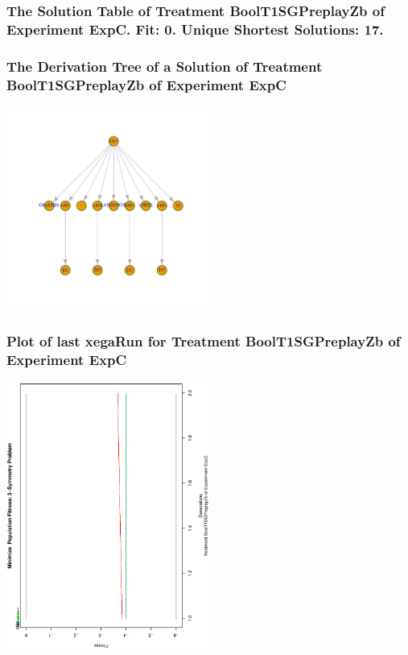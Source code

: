 \documentclass[18pt,c]{beamer}
\begin{document}
 \begin{frame}
 \fontsize{8pt}{9pt}\selectfont
 \frametitle{ The Solution Table of Treatment BoolT1SGPreplayZb of Experiment ExpC. Fit: 0. Unique Shortest Solutions: 17. }

 \label{ExpCSolutionTable003.tex}  
 \end{frame}

 \begin{frame}
 \frametitle{ The Derivation Tree of a Solution of Treatment BoolT1SGPreplayZb of Experiment ExpC }
 \begin{center}
\includegraphics[width=0.5\textwidth, angle=0]
{ExpCDerivationTreeFigure003.pdf}
 \end{center}
 \label{report/ExpCDerivationTreeFigure003.pdf}  
 \end{frame}

 \begin{frame}
 \frametitle{ Plot of last xegaRun for Treatment BoolT1SGPreplayZb of Experiment ExpC }
 \begin{center}
\includegraphics[width=0.5\textwidth, angle=-90]
{ExpCPlotPopStatsFigure003.eps}
 \end{center}
 \label{report/ExpCPlotPopStatsFigure003.eps}  
 \end{frame}
\end{document}
